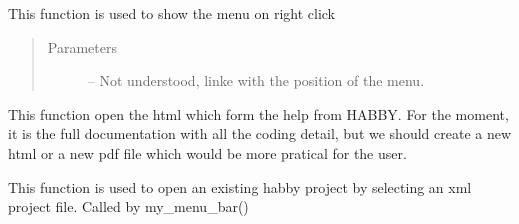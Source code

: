 \documentclass[letterpaper,10pt,english]{sphinxmanual}
\begin{document}
\begin{fulllineitems}
\begin{fulllineitems}
\end{fulllineitems}


\begin{fulllineitems}
\label{\detokenize{index:src_GUI.Main_windows_1.MainWindows.on_context_menu}}
This function is used to show the menu on right click
\begin{quote}\begin{description}
\item[{Parameters}] \leavevmode
{} -- Not understood, linke with the position of the menu.

\end{description}\end{quote}

\end{fulllineitems}


\begin{fulllineitems}
\label{\detokenize{index:src_GUI.Main_windows_1.MainWindows.open_help}}
This function open the html which form the help from HABBY. For the moment, it is the full documentation
with all the coding detail, but we should create a new html or a new pdf file which would be more pratical
for the user.

\end{fulllineitems}


\begin{fulllineitems}
\label{\detokenize{index:src_GUI.Main_windows_1.MainWindows.open_project}}
This function is used to open an existing habby project by selecting an xml project file. Called by
my\_menu\_bar()

\end{fulllineitems}



\end{fulllineitems}
\end{document}
